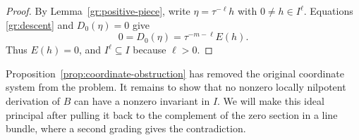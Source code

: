 \begin{proof}
By Lemma~\ref{gr:positive-piece}, write
$\eta=\tau^{-\ell}h$ with $0\ne h\in I^\ell$.
Equations \eqref{gr:descent} and $D_0(\eta)=0$ give
\[
 0=D_0(\eta)=\tau^{-m-\ell}E(h).
\]
Thus $E(h)=0$, and $I^\ell\subseteq I$ because $\ell>0$.
\end{proof}

Proposition~\ref{prop:coordinate-obstruction} has removed the
original coordinate system from the problem.  It remains to show
that no nonzero locally nilpotent derivation of $B$ can have a
nonzero invariant in $I$.  We will make this ideal principal after
pulling it back to the complement of the zero section in a line bundle,
where a second grading gives the contradiction.
